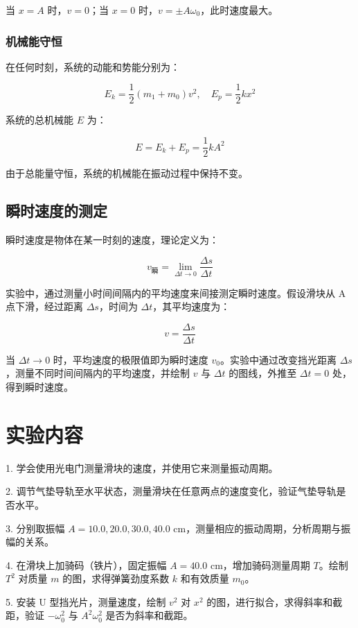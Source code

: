 \documentclass[zihao=5, UTF8]{article}
\theoremstyle{MyLineTheoremStyle} %
\theoremstyle{MyBlockTheoremStyle} %
\theoremstyle{MySubsubsectionStyle} %
\begin{document}
当 $x = A$ 时，$v = 0$；当 $x = 0$ 时，$v = \pm A \omega_0$，此时速度最大。

\subsubsection{机械能守恒}

在任何时刻，系统的动能和势能分别为：

\[
E_k = \frac{1}{2} (m_1 + m_0) v^2, \quad E_p = \frac{1}{2} k x^2
\]

系统的总机械能 $E$ 为：

\[
E = E_k + E_p = \frac{1}{2} k A^2
\]

由于总能量守恒，系统的机械能在振动过程中保持不变。

\subsection{瞬时速度的测定}

瞬时速度是物体在某一时刻的速度，理论定义为：

\[
v_{\text{瞬}} = \lim_{\Delta t \to 0} \frac{\Delta s}{\Delta t}
\]

实验中，通过测量小时间间隔内的平均速度来间接测定瞬时速度。假设滑块从 A 点下滑，经过距离 $\Delta s$，时间为 $\Delta t$，其平均速度为：

\[
v = \frac{\Delta s}{\Delta t}
\]

当 $\Delta t \to 0$ 时，平均速度的极限值即为瞬时速度 $v_0$。实验中通过改变挡光距离 $\Delta s$，测量不同时间间隔内的平均速度，并绘制 $v$ 与 $\Delta t$ 的图线，外推至 $\Delta t = 0$ 处，得到瞬时速度。


\section{实验内容}

1. 学会使用光电门测量滑块的速度，并使用它来测量振动周期。

2. 调节气垫导轨至水平状态，测量滑块在任意两点的速度变化，验证气垫导轨是否水平。

3. 分别取振幅 $A = 10.0, 20.0, 30.0, 40.0$ cm，测量相应的振动周期，分析周期与振幅的关系。

4. 在滑块上加骑码（铁片），固定振幅 $A = 40.0$ cm，增加骑码测量周期 $T$。绘制 $T^2$ 对质量 $m$ 的图，求得弹簧劲度系数 $k$ 和有效质量 $m_0$。

5. 安装 U 型挡光片，测量速度，绘制 $v^2$ 对 $x^2$ 的图，进行拟合，求得斜率和截距，验证 $- \omega_0^2$ 与 $A^2 \omega_0^2$ 是否为斜率和截距。
\end{document}
